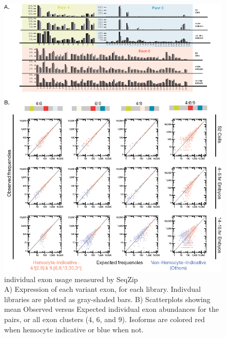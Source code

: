 		\begin{figure} %
		  \centering 
		  \includegraphics{Figures/SeqZipPaper/Roy2014Fig5.eps}
		  \caption[\dscam{} individual exon usage measured by SeqZip]
		  {\dscam{} individual exon usage measured by SeqZip\\[0.25cm]
		    A) Expression of each variant exon, for each library. Indivdual libraries are plotted as gray-shaded bars. B) Scatterplots showing mean Observed versus Expected individual exon abundances for the pairs, or all exon clusters (4, 6, and 9). Isoforms are colored red when hemocyte indicative or blue when not.
		    }
		  \label{SeqZipPaper:fig:Roy2014 F5}
		  \end{figure}

